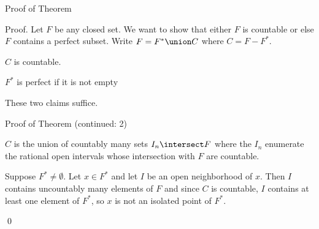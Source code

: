 \begin{frame}{Proof of Theorem}
\begin{block}{Proof.}
Let $F$ be any closed set. We want to show that either $F$ is countable or
else $F$ contains a perfect subset.  Write $F = F^* \union C$ where
$C=F-F^*$.

\begin{claim}[1]
$C$ is countable.
\end{claim}

\begin{claim}[2]
$F^*$ is perfect if it is not empty
\end{claim}

\pause

These two claims suffice.

\end{block}

\end{frame}

\begin{frame}{Proof of Theorem (continued: 2)}
\begin{subproof}
$C$ is the union of countably many sets $I_n \intersect F$ where the
$I_n$ enumerate the rational open intervals whose intersection
with $F$ are countable.
\end{subproof}

\begin{subproof}
Suppose $F^* \neq \emptyset.$ Let $x\in F^*$ and let $I$ be an open
neighborhood of $x$. Then $I$ contains uncountably many elements of $F$ and
since $C$ is countable, $I$ contains at least one element of $F^*$, so $x$
is not an isolated point of $F^*$.
\end{subproof}

\qed

\end{frame}

